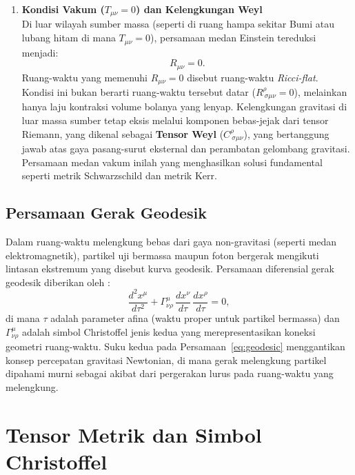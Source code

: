 \begin{enumerate}[label=(\alph*), wide=0pt, leftmargin=*]
    \item \textbf{Kondisi Vakum ($T_{\mu\nu} = 0$) dan Kelengkungan Weyl}\\
    Di luar wilayah sumber massa (seperti di ruang hampa sekitar Bumi atau lubang hitam di mana $T_{\mu\nu} = 0$), persamaan medan Einstein tereduksi menjadi:
    \begin{equation}
        R_{\mu\nu} = 0.
        \label{eq:efe-vacuum}
    \end{equation}
    Ruang-waktu yang memenuhi $R_{\mu\nu} = 0$ disebut ruang-waktu \textit{Ricci-flat}. Kondisi ini bukan berarti ruang-waktu tersebut datar ($R^\rho_{\ \sigma\mu\nu} = 0$), melainkan hanya laju kontraksi volume bolanya yang lenyap. Kelengkungan gravitasi di luar massa sumber tetap eksis melalui komponen bebas-jejak dari tensor Riemann, yang dikenal sebagai \textbf{Tensor Weyl} ($C^\rho_{\ \sigma\mu\nu}$), yang bertanggung jawab atas gaya pasang-surut eksternal dan perambatan gelombang gravitasi. Persamaan medan vakum inilah yang menghasilkan solusi fundamental seperti metrik Schwarzschild dan metrik Kerr.
\end{enumerate}

\subsection{Persamaan Gerak Geodesik}
\label{subsec:geodesik-gerak}

Dalam ruang-waktu melengkung bebas dari gaya non-gravitasi (seperti medan elektromagnetik), partikel uji bermassa maupun foton bergerak mengikuti lintasan ekstremum yang disebut kurva geodesik. Persamaan diferensial gerak geodesik diberikan oleh \parencite{Carroll2004SpacetimeGeometry, Schutz2009FirstCourse}:
\begin{equation}
    \frac{d^2 x^\mu}{d\tau^2}
    + \Gamma^\mu_{\nu\rho}\,\frac{dx^\nu}{d\tau}\,\frac{dx^\rho}{d\tau} = 0,
    \label{eq:geodesic}
\end{equation}
di mana $\tau$ adalah parameter afina (waktu proper untuk partikel bermassa) dan $\Gamma^\mu_{\nu\rho}$ adalah simbol Christoffel jenis kedua yang merepresentasikan koneksi geometri ruang-waktu. Suku kedua pada Persamaan~\eqref{eq:geodesic} menggantikan konsep percepatan gravitasi Newtonian, di mana gerak melengkung partikel dipahami murni sebagai akibat dari pergerakan lurus pada ruang-waktu yang melengkung.


\section{Tensor Metrik dan Simbol Christoffel}
\label{sec:metrik-christoffel}

